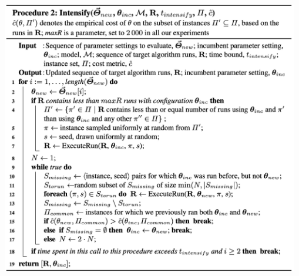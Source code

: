 \documentclass[10pt]{article}
\theoremstyle{definition}
\begin{document}
\includegraphics[width=14cm, height = 12cm]{Intensify.png}
\end{document}

